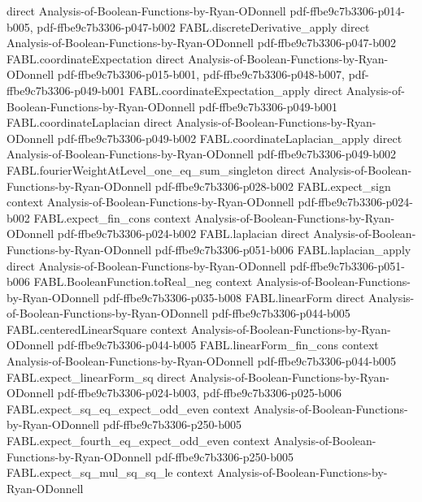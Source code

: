 \begin{theorem}
  {direct}
  {Analysis-of-Boolean-Functions-by-Ryan-ODonnell}
  {pdf-ffbe9c7b3306-p014-b005,
    pdf-ffbe9c7b3306-p047-b002}
\proofstep
  {FABL.discreteDerivative_apply}
  {direct}
  {Analysis-of-Boolean-Functions-by-Ryan-ODonnell}
  {pdf-ffbe9c7b3306-p047-b002}
\proofstep
  {FABL.coordinateExpectation}
  {direct}
  {Analysis-of-Boolean-Functions-by-Ryan-ODonnell}
  {pdf-ffbe9c7b3306-p015-b001,
    pdf-ffbe9c7b3306-p048-b007,
    pdf-ffbe9c7b3306-p049-b001}
\proofstep
  {FABL.coordinateExpectation_apply}
  {direct}
  {Analysis-of-Boolean-Functions-by-Ryan-ODonnell}
  {pdf-ffbe9c7b3306-p049-b001}
\proofstep
  {FABL.coordinateLaplacian}
  {direct}
  {Analysis-of-Boolean-Functions-by-Ryan-ODonnell}
  {pdf-ffbe9c7b3306-p049-b002}
\proofstep
  {FABL.coordinateLaplacian_apply}
  {direct}
  {Analysis-of-Boolean-Functions-by-Ryan-ODonnell}
  {pdf-ffbe9c7b3306-p049-b002}
\proofstep
  {FABL.fourierWeightAtLevel_one_eq_sum_singleton}
  {direct}
  {Analysis-of-Boolean-Functions-by-Ryan-ODonnell}
  {pdf-ffbe9c7b3306-p028-b002}
\proofstep
  {FABL.expect_sign}
  {context}
  {Analysis-of-Boolean-Functions-by-Ryan-ODonnell}
  {pdf-ffbe9c7b3306-p024-b002}
\proofstep
  {FABL.expect_fin_cons}
  {context}
  {Analysis-of-Boolean-Functions-by-Ryan-ODonnell}
  {pdf-ffbe9c7b3306-p024-b002}
\proofstep
  {FABL.laplacian}
  {direct}
  {Analysis-of-Boolean-Functions-by-Ryan-ODonnell}
  {pdf-ffbe9c7b3306-p051-b006}
\proofstep
  {FABL.laplacian_apply}
  {direct}
  {Analysis-of-Boolean-Functions-by-Ryan-ODonnell}
  {pdf-ffbe9c7b3306-p051-b006}
\proofstep
  {FABL.BooleanFunction.toReal_neg}
  {context}
  {Analysis-of-Boolean-Functions-by-Ryan-ODonnell}
  {pdf-ffbe9c7b3306-p035-b008}
\proofstep
  {FABL.linearForm}
  {direct}
  {Analysis-of-Boolean-Functions-by-Ryan-ODonnell}
  {pdf-ffbe9c7b3306-p044-b005}
\proofstep
  {FABL.centeredLinearSquare}
  {context}
  {Analysis-of-Boolean-Functions-by-Ryan-ODonnell}
  {pdf-ffbe9c7b3306-p044-b005}
\proofstep
  {FABL.linearForm_fin_cons}
  {context}
  {Analysis-of-Boolean-Functions-by-Ryan-ODonnell}
  {pdf-ffbe9c7b3306-p044-b005}
\proofstep
  {FABL.expect_linearForm_sq}
  {direct}
  {Analysis-of-Boolean-Functions-by-Ryan-ODonnell}
  {pdf-ffbe9c7b3306-p024-b003,
    pdf-ffbe9c7b3306-p025-b006}
\proofstep
  {FABL.expect_sq_eq_expect_odd_even}
  {context}
  {Analysis-of-Boolean-Functions-by-Ryan-ODonnell}
  {pdf-ffbe9c7b3306-p250-b005}
\proofstep
  {FABL.expect_fourth_eq_expect_odd_even}
  {context}
  {Analysis-of-Boolean-Functions-by-Ryan-ODonnell}
  {pdf-ffbe9c7b3306-p250-b005}
\proofstep
  {FABL.expect_sq_mul_sq_sq_le}
  {context}
  {Analysis-of-Boolean-Functions-by-Ryan-ODonnell}

\end{theorem}
